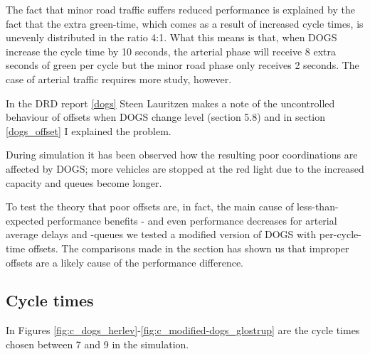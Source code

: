 The fact that minor road traffic suffers reduced performance is explained by the fact that the extra green-time, which comes as a result of increased cycle times, is unevenly distributed in the ratio 4:1. What this means is that, when DOGS increase the cycle time by 10 seconds, the arterial phase will receive 8 extra seconds of green per cycle but the minor road phase only receives 2 seconds. 
The case of arterial traffic requires more study, however.

In the DRD report \ref{dogs} Steen Lauritzen makes a note of the uncontrolled behaviour of offsets when DOGS change level (section 5.8) and in section \ref{dogs_offset} I explained the problem.

During simulation it has been observed how the resulting poor coordinations are affected by DOGS; more vehicles are stopped at the red light due to the increased capacity and queues become longer. 

To test the theory that poor offsets are, in fact, the main cause of less-than-expected performance benefits - and even performance decreases for arterial average delays and -queues we tested a modified version of DOGS with per-cycle-time offsets. The comparisons made in the section has shown us that improper offsets are a likely cause of the performance difference.

\subsection{Cycle times}
In Figures \ref{fig:c_dogs_herlev}-\ref{fig:c_modified-dogs_glostrup} are the cycle times chosen between 7 and 9 in the simulation.

